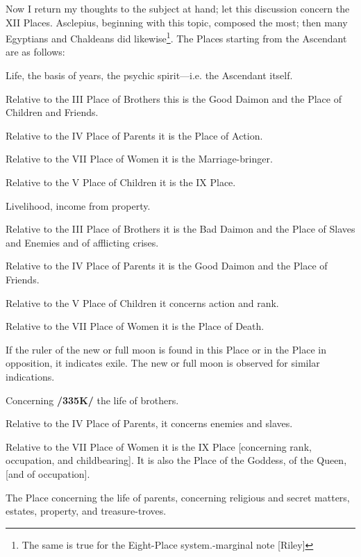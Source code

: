 Now I return my thoughts to the subject at hand; let this discussion concern the XII Places. Asclepius, beginning with this topic, composed the most; then many Egyptians and Chaldeans did likewise\footnote{The same is true for the Eight-Place system.-marginal note [Riley]}.
The Places starting from the Ascendant are as follows:
\begin{description}[labelindent=0em , labelwidth=1em, labelsep=1em, leftmargin =!]
\item[I.] 
	Life, the basis of years, the psychic spirit—i.e. the Ascendant itself.
	
	Relative to the III Place of Brothers this is the Good Daimon and the Place of Children and Friends. 
	
	Relative to the IV Place of Parents it is the Place of Action. 
	
	Relative to the VII Place of Women it is the Marriage-bringer. 		
	
	Relative to the V Place of Children it is the IX Place.
	
\item[II.]
	 Livelihood, income from property. 
	 
	 Relative to the III Place of Brothers it is the Bad Daimon and the Place of Slaves and Enemies and of afflicting crises. 
	 
	 Relative to the IV Place of Parents it is the Good Daimon and the Place of Friends. 
	 
	 Relative to the V Place of Children it concerns action and rank. 
	 
	 Relative to the VII Place of Women it is the Place of Death. 
	 
	 If the ruler of the new or full moon is found in this Place or in the Place in opposition, it indicates exile. The new or full moon is observed for similar indications.

\item[III.]
	Concerning \textbf{/335K/} the life of brothers. 
	
	Relative to the IV Place of Parents, it concerns enemies and slaves. 
	
	Relative to the VII Place of Women it is the IX Place [concerning rank, occupation, and childbearing]. It is also the Place of the Goddess, of the Queen, [and of occupation].

\item[IV.] 
	The Place concerning the life of parents, concerning religious and secret matters, estates, property, and treasure-troves. 
	

\end{description}

